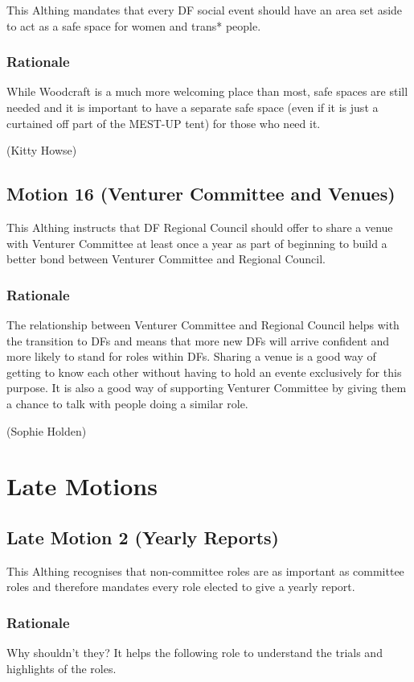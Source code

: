 \documentclass[a4paper, 11pt]{article} %
\begin{document}
This Althing mandates that every DF social event should have an area set aside to act as a safe space for women and trans* people.

\subsubsection{Rationale}

While Woodcraft is a much more welcoming place than most, safe spaces are still needed and it is important to have a separate safe space (even if it is just a curtained off part of the MEST-UP tent) for those who need it.

(Kitty Howse)

\subsection{Motion 16 (Venturer Committee and Venues)}

This Althing instructs that DF Regional Council should offer to share a venue with Venturer Committee at least once a year as part of beginning to build a better bond between Venturer Committee and Regional Council.

\subsubsection{Rationale}
The relationship between Venturer Committee and Regional Council helps with the transition to DFs and means that more new DFs will arrive confident and more likely to stand for roles within DFs.  Sharing a venue is a good way of getting to know each other without having to hold an evente exclusively for this purpose.  It is also a good way of supporting Venturer Committee by giving them a chance to talk with people doing a similar role.

(Sophie Holden)

\section{Late Motions}

\subsection{Late Motion 2 (Yearly Reports)}
This Althing recognises that non-committee roles are as important as committee roles and therefore mandates every role elected to give a yearly report.

\subsubsection{Rationale}
Why shouldn't they? It helps the following role to understand the trials and highlights of the roles.
\end{document}
